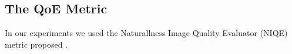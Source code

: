 \subsection{The QoE Metric}
In our experiments we used the Naturallness Image Quality Evaluator (NIQE) metric proposed \cite{mittal2012making}.  

 


